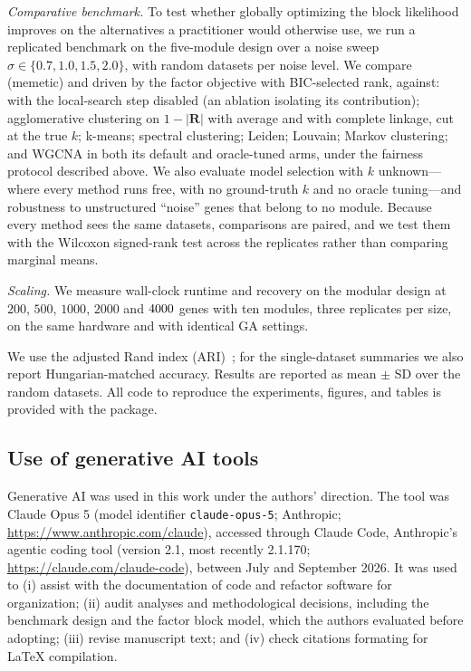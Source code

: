 \emph{Comparative benchmark.} To test whether globally optimizing the block
likelihood improves on the alternatives a practitioner would otherwise use, we
run a replicated benchmark on the five-module design over a noise sweep
$\sigma\in\{0.7,1.0,1.5,2.0\}$, with \NSeeds{} random datasets per noise level.
We compare \tool{} (memetic) and \tool{} driven by the factor objective with
BIC-selected rank, against: \tool{} with the local-search step disabled (an
ablation isolating its contribution); agglomerative clustering on
$1-\lvert\mathbf{R}\rvert$ with average and with complete linkage, cut at the
true $k$; k-means; spectral clustering; Leiden; Louvain; Markov clustering; and
WGCNA in both its default and oracle-tuned arms, under the fairness protocol
described above. We also evaluate model selection with $k$ unknown---where every
method runs free, with no ground-truth $k$ and no oracle tuning---and robustness
to unstructured ``noise'' genes that belong to no module. Because every method
sees the same datasets, comparisons are paired, and we test them with the
Wilcoxon signed-rank test across the \NSeeds{} replicates rather than comparing
marginal means.

\emph{Scaling.} We measure wall-clock runtime and recovery on the modular design
at $200$, $500$, $1000$, $2000$ and $4000{}$ genes with ten modules,
three replicates per size, on the same hardware and with identical GA settings.

We use the adjusted Rand index (ARI)~\cite{HubertArabie1985}; for the single-dataset summaries we also report Hungarian-matched accuracy. Results are reported as mean $\pm$ SD over the random datasets. All code to reproduce the experiments, figures, and tables is provided with the package.

\subsection*{Use of generative AI tools}
Generative AI was used in this work under the authors' direction. The tool was
Claude Opus 5 (model identifier \texttt{claude-opus-5}; Anthropic;
\url{https://www.anthropic.com/claude}), accessed through Claude Code,
Anthropic's agentic coding tool (version 2.1, most recently 2.1.170;
\url{https://claude.com/claude-code}), between July and September 2026. It was
used to (i) assist with the documentation of code and refactor software for organization; (ii) audit analyses and methodological decisions,
including the benchmark design and the factor block model, which the authors
evaluated before adopting; (iii) revise manuscript text; and (iv) check
citations formating for LaTeX compilation.

